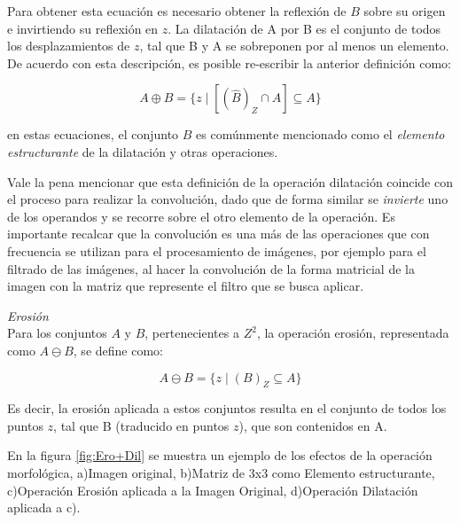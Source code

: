 Para obtener esta ecuación es necesario obtener la reflexión de $B$ sobre su origen e invirtiendo su reflexión en $z$. La dilatación de A por B es el conjunto de todos los desplazamientos de $z$, tal que B y A se sobreponen por al menos un elemento. De acuerdo con esta descripción, es posible re-escribir la anterior definición como:

\begin{equation*}
A \oplus B = \{ z \mid [(\hat{B})_{Z} \cap A] \subseteq A \}
\end{equation*}

en estas ecuaciones, el conjunto $B$ es comúnmente mencionado como el \textit{elemento estructurante} de la dilatación y otras operaciones.

Vale la pena mencionar que esta definición de la operación dilatación coincide con el proceso para realizar la convolución, dado que de forma similar se \textit{invierte} uno de los operandos y se recorre sobre el otro elemento de la operación. Es importante recalcar que la convolución es una más de las operaciones que con frecuencia se utilizan para el procesamiento de imágenes, por ejemplo para el filtrado de las imágenes, al hacer la convolución de la forma matricial de la imagen con la matriz que represente el filtro que se busca aplicar. 

\emph{Erosión}\\

Para los conjuntos $A$ y $B$, pertenecientes a $Z^{2}$, la operación erosión, representada como $A \ominus B$, se define como:

\begin{equation*}
A \ominus B = \{ z \mid (B)_{Z} \subseteq A \}
\end{equation*}

Es decir, la erosión aplicada a estos conjuntos resulta en el conjunto de todos los puntos $z$, tal que B (traducido en puntos $z$), que son contenidos en A.

En la figura \ref{fig:Ero+Dil} se muestra un ejemplo de los efectos de la operación morfológica, a)Imagen original, b)Matriz de 3x3 como Elemento estructurante, c)Operación Erosión aplicada a la Imagen Original, d)Operación Dilatación aplicada a c).

